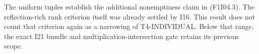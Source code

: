 The uniform tuples establish the additional nonemptiness claim
in (F1I04.3). The reflection-rich rank criterion itself was
already settled by I16. This result does not count that
criterion again as a narrowing of T4-INDIVIDUAL. Below that
range, the exact I21 bundle and multiplication-intersection
gate retains its previous scope.
